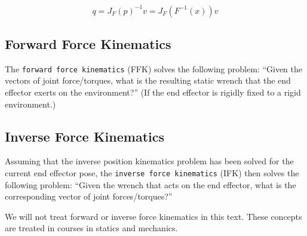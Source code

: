 \[q = J_F(p)^{-1} v = J_F\left( F^{-1}(x) \right) v\]

\hypertarget{forward-force-kinematics}{%
\subsection{Forward Force Kinematics}\label{forward-force-kinematics}}

The \texttt{forward\ force\ kinematics} (FFK) solves the following
problem: ``Given the vectors of joint force/torques, what is the
resulting static wrench that the end effector exerts on the
environment?'' (If the end effector is rigidly fixed to a rigid
environment.)

\hypertarget{inverse-force-kinematics}{%
\subsection{Inverse Force Kinematics}\label{inverse-force-kinematics}}

Assuming that the inverse position kinematics problem has been solved
for the current end effector pose, the
\texttt{inverse\ force\ kinematics} (IFK) then solves the following
problem: ``Given the wrench that acts on the end effector, what is the
corresponding vector of joint forces/torques?''

We will not treat forward or inverse force kinematics in this text.
These concepts are treated in courses in statics and mechanics.
